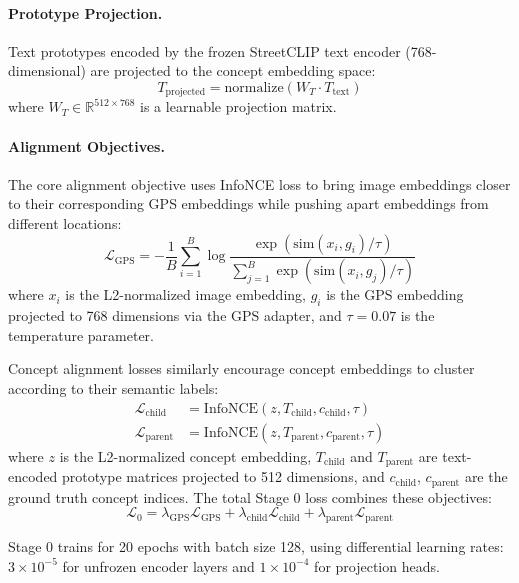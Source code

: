 \documentclass{uva-inf-article}
\begin{document}
\paragraph{Prototype Projection.}
Text prototypes encoded by the frozen StreetCLIP text encoder (768-dimensional) are projected to the concept embedding space:
\begin{equation}
T_{\text{projected}} = \text{normalize}(W_T \cdot T_{\text{text}})
\end{equation}
where $W_T \in \mathbb{R}^{512 \times 768}$ is a learnable projection matrix.

\paragraph{Alignment Objectives.}
The core alignment objective uses InfoNCE loss \parencite{oord2018infonce} to bring image embeddings closer to their corresponding GPS embeddings while pushing apart embeddings from different locations:
\begin{equation}
\mathcal{L}_{\text{GPS}} = -\frac{1}{B}\sum_{i=1}^{B}\log\frac{\exp(\text{sim}(x_i, g_i)/\tau)}{\sum_{j=1}^{B}\exp(\text{sim}(x_i, g_j)/\tau)}
\end{equation}
where $x_i$ is the L2-normalized image embedding, $g_i$ is the GPS embedding projected to 768 dimensions via the GPS adapter, and $\tau = 0.07$ is the temperature parameter.

Concept alignment losses similarly encourage concept embeddings to cluster according to their semantic labels:
\begin{align}
\mathcal{L}_{\text{child}} &= \text{InfoNCE}(z, T_{\text{child}}, c_{\text{child}}, \tau) \\
\mathcal{L}_{\text{parent}} &= \text{InfoNCE}(z, T_{\text{parent}}, c_{\text{parent}}, \tau)
\end{align}
where $z$ is the L2-normalized concept embedding, $T_{\text{child}}$ and $T_{\text{parent}}$ are text-encoded prototype matrices projected to 512 dimensions, and $c_{\text{child}}$, $c_{\text{parent}}$ are the ground truth concept indices. The total Stage 0 loss combines these objectives:
\begin{equation}
\mathcal{L}_0 = \lambda_{\text{GPS}}\mathcal{L}_{\text{GPS}} + \lambda_{\text{child}}\mathcal{L}_{\text{child}} + \lambda_{\text{parent}}\mathcal{L}_{\text{parent}}
\end{equation}

Stage 0 trains for 20 epochs with batch size 128, using differential learning rates: $3 \times 10^{-5}$ for unfrozen encoder layers and $1 \times 10^{-4}$ for projection heads.
\end{document}
